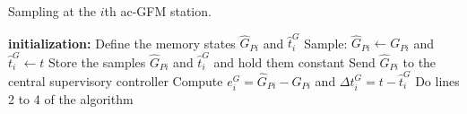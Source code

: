 \begin{algorithm}
\small
\caption{Sampling at the $i$th ac-GFM station.}\label{LocalACAlgorithm}
\begin{algorithmic}[1]
\Statex\textbf{initialization:}
\State Define the memory states $\hat{G}_{Pi}$ and $\hat{t}_i^G$
\Statex {}
\State Sample: $\hat{G}_{Pi}\gets G_{Pi}$ and $\hat{t}_{i}^G\gets t$
\State Store the samples $\hat{G}_{Pi}$ and $\hat{t}_{i}^G$ and hold them constant
\State Send $\hat{G}_{Pi}$ to the central supervisory controller
\State Compute $e_i^G=\hat{G}_{Pi}-G_{Pi}$ and $\Delta t_i^G= t - \hat{t}_{i}^G$
\text{ }
\State Do lines 2 to 4 of the algorithm
\EndIf
\EndWhile
\end{algorithmic}
\end{algorithm}